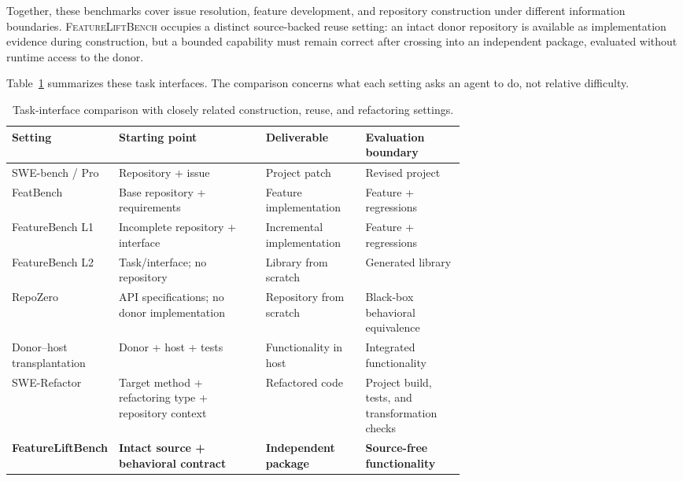 \documentclass[acmsmall,screen,review,anonymous]{acmart}
\newcommand{\flb}{\textsc{FeatureLiftBench}\xspace}
\begin{document}
Together, these benchmarks cover issue resolution, feature development, and
repository construction under different information boundaries. \flb occupies
a distinct source-backed reuse setting: an intact donor repository is available
as implementation evidence during construction, but a bounded capability must
remain correct after crossing into an independent package, evaluated without
runtime access to the donor.

Table~\ref{tab:task-comparison} summarizes these task interfaces. The comparison
concerns what each setting asks an agent to do, not relative difficulty.

\begin{table}[htbp]
  \caption{Task-interface comparison with closely related construction, reuse,
  and refactoring settings.}
  \label{tab:task-comparison}
  \centering
  \small
  \setlength{\tabcolsep}{4.2pt}
  \renewcommand{\arraystretch}{1.12}
  \begin{tabularx}{\linewidth}{
    @{}
    >{\raggedright\arraybackslash}p{0.23\linewidth}
    >{\centering\arraybackslash}X
    >{\centering\arraybackslash}p{0.22\linewidth}
    >{\centering\arraybackslash}p{0.22\linewidth}
    @{}
  }
    \toprule
    \textbf{Setting} & \textbf{Starting point} & \textbf{Deliverable} & \textbf{Evaluation boundary} \\
    \midrule
    SWE-bench / Pro
      & Repository + issue
      & Project patch
      & Revised project \\
    FeatBench
      & Base repository + requirements
      & Feature implementation
      & Feature + regressions \\
    FeatureBench L1
      & Incomplete repository + interface
      & Incremental implementation
      & Feature + regressions \\
    FeatureBench L2
      & Task/interface; no repository
      & Library from scratch
      & Generated library \\
    RepoZero
      & API specifications; no donor implementation
      & Repository from scratch
      & Black-box behavioral equivalence \\
    Donor--host transplantation
      & Donor + host + tests
      & Functionality in host
      & Integrated functionality \\
    SWE-Refactor
      & Target method + refactoring type + repository context
      & Refactored code
      & Project build, tests, and transformation checks \\
    \midrule
    \textbf{FeatureLiftBench}
      & \textbf{Intact source + behavioral contract}
      & \textbf{Independent package}
      & \textbf{Source-free functionality} \\
    \bottomrule
  \end{tabularx}
\end{table}
\end{document}
